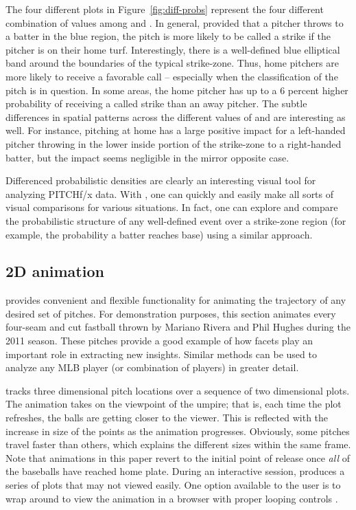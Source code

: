 \begin{article}
The four different plots in Figure~\ref{fig:diff-probs} represent
the four different combination of values among  and
. In general, provided that a pitcher throws to a batter
in the blue region, the pitch is more likely to be called a strike
if the pitcher is on their home turf. Interestingly, there is a well-defined
blue elliptical band around the boundaries of the typical strike-zone.
Thus, home pitchers are more likely to receive a favorable call --
especially when the classification of the pitch is in question. In
some areas, the home pitcher has up to a 6 percent higher probability
of receiving a called strike than an away pitcher. The subtle differences
in spatial patterns across the different values of 
and  are interesting as well. For instance, pitching
at home has a large positive impact for a left-handed pitcher throwing
in the lower inside portion of the strike-zone to a right-handed batter,
but the impact seems negligible in the mirror opposite case.

Differenced probabilistic densities are clearly an interesting visual
tool for analyzing PITCHf/x data. With , one can quickly
and easily make all sorts of visual comparisons for various situations.
In fact, one can explore and compare the probabilistic structure of
any well-defined event over a strike-zone region (for example, the
probability a batter reaches base) using a similar approach. 


\subsection{2D animation}

 provides convenient and flexible functionality for
animating the trajectory of any desired set of pitches. For demonstration
purposes, this section animates every four-seam and cut fastball thrown
by Mariano Rivera and Phil Hughes during the 2011 season. These pitches
provide a good example of how facets play an important role in extracting
new insights. Similar methods can be used to analyze any MLB player
(or combination of players) in greater detail.

 tracks three dimensional pitch locations over a
sequence of two dimensional plots. The animation takes on the viewpoint
of the umpire; that is, each time the plot refreshes, the balls are
getting closer to the viewer. This is reflected with the increase
in size of the points as the animation progresses. Obviously, some
pitches travel faster than others, which explains the different sizes
within the same frame. Note that animations in this paper revert to
the initial point of release once \emph{all} of the baseballs have
reached home plate. During an interactive session, 
produces a series of plots that may not viewed easily. One option
available to the user is to wrap  around
 to view the animation in a browser with proper looping
controls \citep{animation}.


\end{article}
